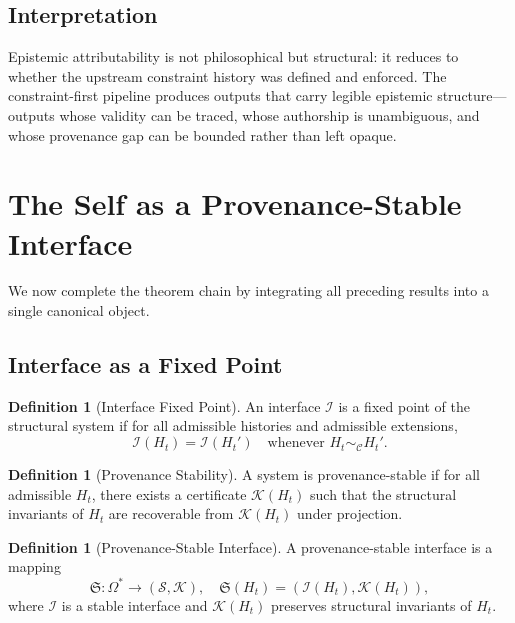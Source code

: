 \documentclass[12pt, a4paper]{article}
\theoremstyle{plain}
\theoremstyle{definition}
\newtheorem{definition}[theorem]{Definition}
\theoremstyle{remark}
\begin{document}
\subsection{Interpretation}

Epistemic attributability is not philosophical but structural: it reduces to whether the upstream constraint history was defined and enforced. The constraint-first pipeline produces outputs that carry legible epistemic structure---outputs whose validity can be traced, whose authorship is unambiguous, and whose provenance gap can be bounded rather than left opaque.

\section{The Self as a Provenance-Stable Interface}

We now complete the theorem chain by integrating all preceding results into a single canonical object.

\subsection{Interface as a Fixed Point}

\begin{definition}[Interface Fixed Point]
An interface $\mathcal{I}$ is a fixed point of the structural system if for all admissible histories and admissible extensions,
\[
\mathcal{I}(H_t) = \mathcal{I}(H_t') \quad \text{whenever } H_t \sim_{\mathcal{C}} H_t'.
\]
\end{definition}

\begin{definition}[Provenance Stability]
A system is provenance-stable if for all admissible $H_t$, there exists a certificate $\mathcal{K}(H_t)$ such that the structural invariants of $H_t$ are recoverable from $\mathcal{K}(H_t)$ under projection.
\end{definition}

\begin{definition}[Provenance-Stable Interface]
A provenance-stable interface is a mapping
\[
\mathfrak{S} : \Omega^* \to (\mathcal{S}, \mathcal{K}), \quad \mathfrak{S}(H_t) = (\mathcal{I}(H_t), \mathcal{K}(H_t)),
\]
where $\mathcal{I}$ is a stable interface and $\mathcal{K}(H_t)$ preserves structural invariants of $H_t$.
\end{definition}
\end{document}
